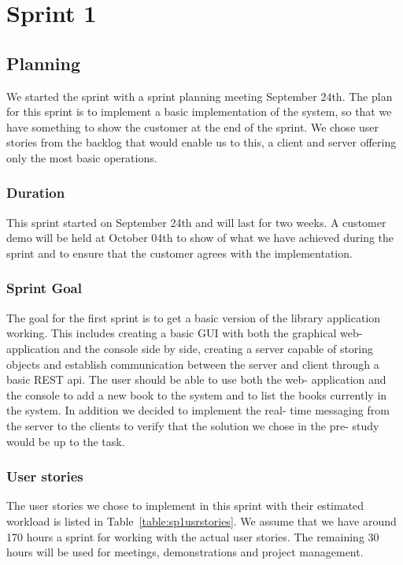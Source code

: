 \chapter{Sprint 1}
\section{Planning}
We started the sprint with a sprint planning meeting September 24th. The plan for this sprint is to implement a basic implementation of the system, so that we have something to show the customer at the end of the sprint. We chose user stories from the backlog that would enable us to this, a client and server offering only the most basic operations. 

\subsection{Duration}
This sprint started on September 24th and will last for two weeks. A customer demo will be held at October 04th to show of what we have achieved during the sprint and to ensure that the customer agrees with the implementation.

\subsection{Sprint Goal}
The goal for the first sprint is to get a basic version of the library application working. This includes creating a basic GUI with both the graphical web- application and the console side by side, creating a server capable of storing objects and establish communication between the server and client through a basic REST api. The user should be able to use both the web- application and the console to add a new book to the system and to list the books currently in the system. In addition we decided to implement the real- time messaging from the server to the clients to verify that the solution we chose in the pre- study would be up to the task.

\subsection{User stories}
The user stories we chose to implement in this sprint with their estimated workload is listed in Table~\ref{table:sp1usrstories}. We assume that we have around 170 hours a sprint for working with the actual user stories. The remaining 30 hours will be used for meetings, demonstrations and project management.

